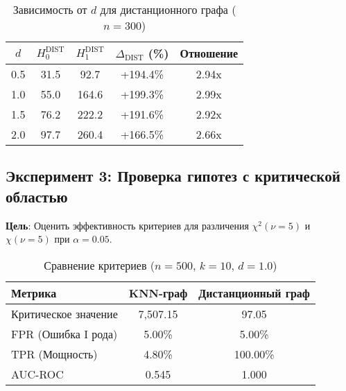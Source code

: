 \documentclass[a4paper, 12pt]{article}
\begin{document}
\begin{table}[H]
    \centering
    \begin{tabular}{|c|c|c|c|c|}
        \hline
        \(d\) & \(H_0^{\text{DIST}}\) & \(H_1^{\text{DIST}}\) & \(\Delta_{\text{DIST}}\) (\%) & Отношение \\ \hline
        0.5 & 31.5 & 92.7 & +194.4\% & 2.94x \\ 
        1.0 & 55.0 & 164.6 & +199.3\% & 2.99x \\ 
        1.5 & 76.2 & 222.2 & +191.6\% & 2.92x \\ 
        2.0 & 97.7 & 260.4 & +166.5\% & 2.66x \\ \hline
    \end{tabular}
    \caption{Зависимость от \(d\) для дистанционного графа (\(n=300\))}
    \label{tab:dist_d}
\end{table}

\subsection{Эксперимент 3: Проверка гипотез с критической областью}
\label{exp3}

\textbf{Цель}: Оценить эффективность критериев для различения \(\chi^2(\nu=5)\) и \(\chi(\nu=5)\) при \(\alpha=0.05\).

\begin{table}[H]
    \centering
    \begin{tabular}{|l|c|c|}
        \hline
        \textbf{Метрика} & \textbf{KNN-граф} & \textbf{Дистанционный граф} \\ \hline
        Критическое значение & 7,507.15 & 97.05 \\ 
        FPR (Ошибка I рода) & 5.00\% & 5.00\% \\ 
        TPR (Мощность) & 4.80\% & 100.00\% \\ 
        AUC-ROC & 0.545 & 1.000 \\ \hline
    \end{tabular}
    \caption{Сравнение критериев (\(n=500\), \(k=10\), \(d=1.0\))}
    \label{tab:exp3_results}
\end{table}
\end{document}
